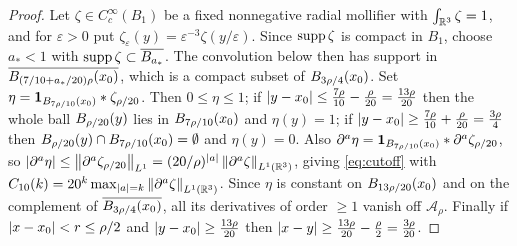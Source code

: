 \documentclass[11pt,reqno]{amsart}
\begin{document}
\begin{proof}
Let $\zeta\in C_{c}^{\infty}(B_{1})$ be a fixed nonnegative radial mollifier with
$\int_{\mathbb{R}^{3}}\zeta=1$, and for $\varepsilon>0$ put
$\zeta_{\varepsilon}(y)=\varepsilon^{-3}\zeta(y/\varepsilon)$.
Since $\operatorname{supp}\zeta$ is compact in $B_1$, choose $a_*<1$ with
$\operatorname{supp}\zeta\subset\overline{B_{a_*}}$. The convolution below then has
support in $\overline{B_{(7/10+a_*/20)\rho}(x_0)}$, which is a compact
subset of $B_{3\rho/4}(x_0)$. Set
$\eta=\mathbf{1}_{B_{7\rho/10}(x_{0})}*\zeta_{\rho/20}$. Then
$0\le\eta\le1$; if $\left\lvert y-x_{0} \right\rvert\le\tfrac{7\rho}{10}-\tfrac{\rho}{20}
=\tfrac{13\rho}{20}$ then the whole ball $B_{\rho/20}(y)$ lies in
$B_{7\rho/10}(x_{0})$ and $\eta(y)=1$; if
$\left\lvert y-x_{0} \right\rvert\ge\tfrac{7\rho}{10}+\tfrac{\rho}{20}=\tfrac{3\rho}{4}$ then
$B_{\rho/20}(y)\cap B_{7\rho/10}(x_{0})=\emptyset$ and $\eta(y)=0$. Also
$\partial^{a}\eta=\mathbf{1}_{B_{7\rho/10}(x_{0})}*\partial^{a}\zeta_{\rho/20}$,
so
$\left\lvert \partial^{a}\eta \right\rvert\le\left\lVert \partial^{a}\zeta_{\rho/20} \right\rVert_{L^{1}}
 =(20/\rho)^{\left\lvert a \right\rvert}\left\lVert \partial^{a}\zeta \right\rVert_{L^{1}(\mathbb{R}^{3})}$, giving
\eqref{eq:cutoff} with
$C_{10}(k)=20^{k}\max_{\left\lvert a \right\rvert=k}\left\lVert \partial^{a}\zeta \right\rVert_{L^{1}(\mathbb{R}^{3})}$. Since
$\eta$ is constant on $B_{13\rho/20}(x_{0})$ and on the complement of
$\overline{B_{3\rho/4}(x_{0})}$, all its derivatives of order $\ge1$ vanish
off $\mathcal{A}_{\rho}$. Finally if $\left\lvert x-x_{0} \right\rvert<r\le\rho/2$ and
$\left\lvert y-x_{0} \right\rvert\ge\tfrac{13\rho}{20}$ then
$\left\lvert x-y \right\rvert\ge\tfrac{13\rho}{20}-\tfrac{\rho}{2}=\tfrac{3\rho}{20}$.
\end{proof}
\end{document}
